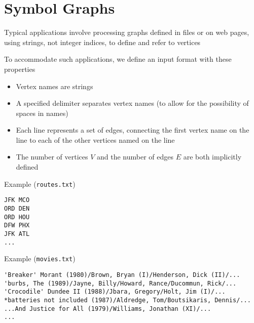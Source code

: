 \documentclass[8pt,a4paper,compress]{beamer}
\begin{document}
\section{Symbol Graphs}
\begin{frame}[fragile]
\pause

Typical applications involve processing graphs defined in files or
on web pages, using strings, not integer indices, to define and refer to vertices

\pause
\bigskip

To accommodate such applications, we define an input format with these properties
\begin{itemize}
\item Vertex names are strings
\item A specified delimiter separates vertex names (to allow for the possibility of spaces in names)
\item Each line represents a set of edges, connecting the first vertex name on the line to each of the other vertices named on the line
\item The number of vertices $V$ and the number of edges $E$ are both implicitly defined
\end{itemize}

\pause
\bigskip

Example (\lstinline{routes.txt})
\begin{lstlisting}[language={},style=focusin]
JFK MCO
ORD DEN
ORD HOU
DFW PHX
JFK ATL
...
\end{lstlisting}

\pause

Example (\lstinline{movies.txt})
\begin{lstlisting}[language={},style=focusin]
'Breaker' Morant (1980)/Brown, Bryan (I)/Henderson, Dick (II)/...
'burbs, The (1989)/Jayne, Billy/Howard, Rance/Ducommun, Rick/... 
'Crocodile' Dundee II (1988)/Jbara, Gregory/Holt, Jim (I)/... 
*batteries not included (1987)/Aldredge, Tom/Boutsikaris, Dennis/...
...And Justice for All (1979)/Williams, Jonathan (XI)/...
...
\end{lstlisting}
\end{frame}
\end{document}
